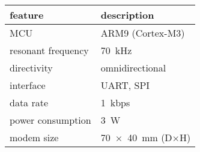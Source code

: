 \begin{tabular}{ll}
  \toprule
  feature & description \\
  \midrule
  MCU & ARM9 (Cortex-M3) \\
  resonant frequency & \SI{70}{\kilo\hertz} \\
  directivity & omnidirectional \\
  interface & UART, SPI \\
  data rate & \SI{1}{kbps} \\
  power consumption & \SI{3}{\watt} \\
  modem size & \SI{70x40}{\milli\meter} (D$\times$H) \\
  \bottomrule
\end{tabular}

